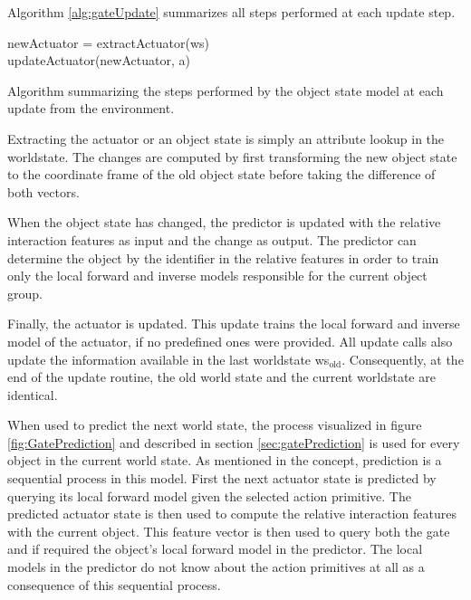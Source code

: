 Algorithm \ref{alg:gateUpdate} summarizes all steps performed at each update step.

\begin{algorithm}
	\BlankLine
	newActuator = extractActuator(ws) \\
	updateActuator(newActuator, a) \\
	\BlankLine
\caption{Algorithm summarizing the steps performed by the object state model at each update from the environment.}
\label{alg:gateUpdate}
\end{algorithm}

Extracting the actuator or an object state is simply an attribute lookup in the worldstate. The changes are computed by first transforming the new object state to the coordinate frame of the old object state before taking the difference of both vectors. 

When the object state has changed, the predictor is updated with the relative interaction features as input and the change as output. The predictor can determine the object by the identifier in the relative features in order to train only the local forward and inverse models responsible for the current object group.

Finally, the actuator is updated. This update trains the local forward and inverse model of the actuator, if no predefined ones were provided.
All update calls also update the information available in the last worldstate ws$_\text{old}$. Consequently, at the end of the update routine, the old world state and the current worldstate are identical.

When used to predict the next world state, the process visualized in figure \ref{fig:GatePrediction} and described in section \ref{sec:gatePrediction} is used for every object in the current world state. As mentioned in the concept, prediction is a sequential process in this model. First the next actuator state is predicted by querying its local forward model given the selected action primitive. The predicted actuator state is then used to compute the relative interaction features with the current object. This feature vector is then used to query both the gate and if required the object's local forward model in the predictor. The local models in the predictor do not know about the action primitives at all as a consequence of this sequential process. %


